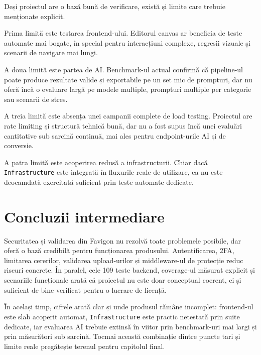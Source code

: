 Deși proiectul are o bază bună de verificare, există și limite care trebuie menționate explicit.

Prima limită este testarea frontend-ului. Editorul canvas ar beneficia de teste automate mai bogate, în special pentru interacțiuni complexe, regresii vizuale și scenarii de navigare mai lungi.

A doua limită este partea de AI. Benchmark-ul actual confirmă că pipeline-ul poate produce rezultate valide și exportabile pe un set mic de prompturi, dar nu oferă încă o evaluare largă pe modele multiple, prompturi multiple per categorie sau scenarii de stres.

A treia limită este absența unei campanii complete de load testing. Proiectul are rate limiting și structură tehnică bună, dar nu a fost supus încă unei evaluări cantitative sub sarcină continuă, mai ales pentru endpoint-urile AI și de conversie.

A patra limită este acoperirea redusă a infrastructurii. Chiar dacă \texttt{Infrastructure} este integrată în fluxurile reale de utilizare, ea nu este deocamdată exercitată suficient prin teste automate dedicate.

\section{Concluzii intermediare}

Securitatea și validarea din Favigon nu rezolvă toate problemele posibile, dar oferă o bază credibilă pentru funcționarea produsului. Autentificarea, 2FA, limitarea cererilor, validarea upload-urilor și middleware-ul de protecție reduc riscuri concrete. În paralel, cele 109 teste backend, coverage-ul măsurat explicit și scenariile funcționale arată că proiectul nu este doar conceptual coerent, ci și suficient de bine verificat pentru o lucrare de licență.

În același timp, cifrele arată clar și unde produsul rămâne incomplet: frontend-ul este slab acoperit automat, \texttt{Infrastructure} este practic netestată prin suite dedicate, iar evaluarea AI trebuie extinsă în viitor prin benchmark-uri mai largi și prin măsurători sub sarcină. Tocmai această combinație dintre puncte tari și limite reale pregătește terenul pentru capitolul final.
